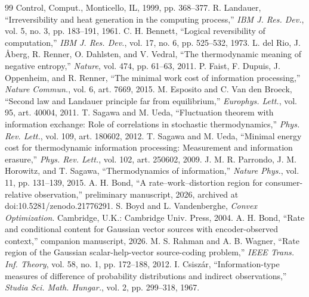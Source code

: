 \documentclass[11pt,onecolumn]{IEEEtran}
\begin{document}
\begin{thebibliography}{99}
{Control, Comput.}, Monticello, IL, 1999, pp. 368--377.
 R. Landauer, ``Irreversibility and heat generation in
the computing process,'' \emph{IBM J. Res. Dev.}, vol. 5, no. 3, pp. 183--191,
1961.
 C. H. Bennett, ``Logical reversibility of computation,''
\emph{IBM J. Res. Dev.}, vol. 17, no. 6, pp. 525--532, 1973.
 L. del Rio, J. \AA berg, R. Renner, O. Dahlsten, and
V. Vedral, ``The thermodynamic meaning of negative entropy,'' \emph{Nature},
vol. 474, pp. 61--63, 2011.
 P. Faist, F. Dupuis, J. Oppenheim, and R. Renner, ``The
minimal work cost of information processing,'' \emph{Nature Commun.}, vol. 6,
art. 7669, 2015.
 M. Esposito and C. Van den Broeck, ``Second law and
Landauer principle far from equilibrium,'' \emph{Europhys. Lett.}, vol. 95,
art. 40004, 2011.
 T. Sagawa and M. Ueda, ``Fluctuation theorem with
information exchange: Role of correlations in stochastic thermodynamics,''
\emph{Phys. Rev. Lett.}, vol. 109, art. 180602, 2012.
 T. Sagawa and M. Ueda, ``Minimal energy cost for
thermodynamic information processing: Measurement and information
erasure,'' \emph{Phys. Rev. Lett.}, vol. 102, art. 250602, 2009.
 J. M. R. Parrondo, J. M. Horowitz, and T. Sagawa,
``Thermodynamics of information,'' \emph{Nature Phys.}, vol. 11,
pp. 131--139, 2015.
 A. H. Bond, ``A rate--work--distortion region for
consumer-relative observation,'' preliminary manuscript, 2026, archived at
doi:10.5281/zenodo.21776291.
 S. Boyd and L. Vandenberghe, \emph{Convex Optimization}.
Cambridge, U.K.: Cambridge Univ. Press, 2004.
 A. H. Bond, ``Rate and conditional content for Gaussian
vector sources with encoder-observed context,'' companion manuscript, 2026.
 M. S. Rahman and A. B. Wagner, ``Rate region of the Gaussian
scalar-help-vector source-coding problem,'' \emph{IEEE Trans. Inf. Theory},
vol. 58, no. 1, pp. 172--188, 2012.
 I. Csisz\'ar, ``Information-type measures of difference
of probability distributions and indirect observations,'' \emph{Studia Sci.
Math. Hungar.}, vol. 2, pp. 299--318, 1967.
\end{thebibliography}

\end{document}
